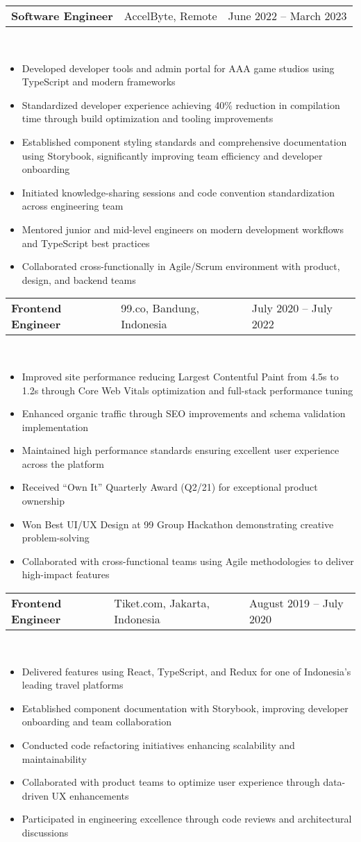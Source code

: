 \documentclass[a4paper, 11pt]{article}
\newcommand{\resumeItem}[1]{
  \item\small{
    {#1 \vspace{-2pt}}
  }
}
\newcommand{\resumeSubheading}[4]{
  \vspace{-2pt}\item
    \begin{tabularx}{0.987\textwidth}[t]{
  >{\raggedright\arraybackslash}X
  >{\centering\arraybackslash}X
  >{\raggedleft\arraybackslash}X }
      \textbf{#1} & #2 & #3 \\
    \end{tabularx}
    \textit{\small#4}\\
    \vspace{-7pt}
}
\newcommand{\resumeItemListStart}{\begin{itemize}[leftmargin=0.22in]}
\newcommand{\resumeItemListEnd}{\end{itemize}\vspace{-20pt}}
\begin{document}
        \resumeSubheading
            {Software Engineer}{AccelByte, Remote}{June 2022 -- March 2023}{}
            \resumeItemListStart
                \resumeItem{Developed developer tools and admin portal for AAA game studios using TypeScript and modern frameworks}
                \resumeItem{Standardized developer experience achieving 40\% reduction in compilation time through build optimization and tooling improvements}
                \resumeItem{Established component styling standards and comprehensive documentation using Storybook, significantly improving team efficiency and developer onboarding}
                \resumeItem{Initiated knowledge-sharing sessions and code convention standardization across engineering team}
                \resumeItem{Mentored junior and mid-level engineers on modern development workflows and TypeScript best practices}
                \resumeItem{Collaborated cross-functionally in Agile/Scrum environment with product, design, and backend teams}
            \resumeItemListEnd

        \resumeSubheading
            {Frontend Engineer}{99.co, Bandung, Indonesia}{July 2020 -- July 2022}{}
            \resumeItemListStart
                \resumeItem{Improved site performance reducing Largest Contentful Paint from 4.5s to 1.2s through Core Web Vitals optimization and full-stack performance tuning}
                \resumeItem{Enhanced organic traffic through SEO improvements and schema validation implementation}
                \resumeItem{Maintained high performance standards ensuring excellent user experience across the platform}
                \resumeItem{Received ``Own It'' Quarterly Award (Q2/21) for exceptional product ownership}
                \resumeItem{Won Best UI/UX Design at 99 Group Hackathon demonstrating creative problem-solving}
                \resumeItem{Collaborated with cross-functional teams using Agile methodologies to deliver high-impact features}
            \resumeItemListEnd

        \resumeSubheading
            {Frontend Engineer}{Tiket.com, Jakarta, Indonesia}{August 2019 -- July 2020}{}
            \resumeItemListStart
                \resumeItem{Delivered features using React, TypeScript, and Redux for one of Indonesia's leading travel platforms}
                \resumeItem{Established component documentation with Storybook, improving developer onboarding and team collaboration}
                \resumeItem{Conducted code refactoring initiatives enhancing scalability and maintainability}
                \resumeItem{Collaborated with product teams to optimize user experience through data-driven UX enhancements}
                \resumeItem{Participated in engineering excellence through code reviews and architectural discussions}
            \resumeItemListEnd
\end{document}
